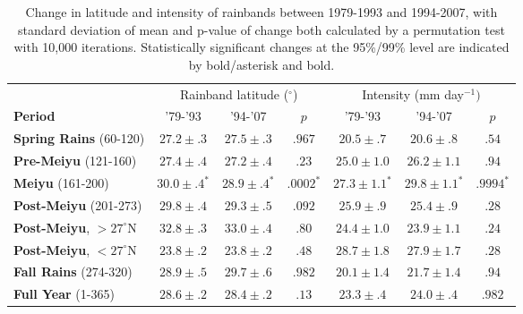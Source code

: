 \documentclass[draft,grl]{agutexSI}
\begin{document}
\begin{table}

\centering

\caption{Change in latitude and intensity of rainbands between 1979-1993 and 1994-2007, with standard deviation of mean and p-value of change both calculated by a permutation test with 10,000 iterations. Statistically significant changes at the 95\%/99\% level are indicated by bold/asterisk and bold.}

\begin{tabular}{ l c c c c c c}
	& \multicolumn{3}{c}{Rainband latitude ($^\circ$)} & \multicolumn{3}{c}{Intensity (mm day$^{-1})$} \\
	\textbf{Period} & '79-'93 & '94-'07 & $p$ & '79-'93 & '94-'07 & $p$ \\
	\hline	
	\textbf{Spring Rains} (60-120)		& $27.2 \pm .3 $ & $27.5 \pm .3 $ & $ .967 $ 	& $20.5 \pm .7$ 	& $20.6 \pm .8 	$ & $.54$ \\
	\textbf{Pre-Meiyu} (121-160) 		& $27.4 \pm .4 $ & $27.2 \pm .4$ & $ .23 $ 	& $25.0 \pm 1.0$ 	& $26.2 \pm 1.1	$ & $.94$ \\
	\textbf{Meiyu} (161-200)			& $\boldsymbol{30.0 \pm .4^*}$ & $\boldsymbol{28.9 \pm .4^*}$ & $\boldsymbol{.0002^*}$ & $\boldsymbol{27.3 \pm 1.1^*}$ 	& $\boldsymbol{29.8 \pm 1.1^*}$  & $\boldsymbol{.9994 ^*}$ \\
	\textbf{Post-Meiyu} (201-273)		& $29.8 \pm .4 $ & $29.3 \pm .5 $ & $ .092 $	& $25.9 \pm .9$ 	& $25.4 \pm .9	$ & $.28$ \\
	\textbf{Post-Meiyu}, $>27^\circ$N 	& $32.8 \pm .3 $ & $33.0 \pm .4 $ & $ .80 $ 	& $24.4 \pm 1.0$ 	& $23.9 \pm 1.1	$ & $.24$ \\
	\textbf{Post-Meiyu}, $<27^\circ$N 	& $23.8 \pm .2 $ & $23.8 \pm .2 $ & $ .48 $ 	& $28.7 \pm 1.8$ 	& $27.9 \pm 1.7	$ & $.28$  \\
	\textbf{Fall Rains} (274-320)			& $\boldsymbol{28.9 \pm .5} $ & $\boldsymbol{29.7 \pm .6} $ & $ \boldsymbol{.982} $ 	& $20.1 \pm 1.4$ 	& $21.7 \pm 1.4	$ & $.94$ \\
	\textbf{Full Year} (1-365)			& $28.6 \pm .2 $ & $28.4 \pm .2 $ & $ .13 $ 	& $\boldsymbol{23.3 \pm .4}$ 	& $\boldsymbol{24.0 \pm .4}	$ & $\boldsymbol{.982}$ \\

\end{tabular}
\label{ts8}
\end{table}
\end{document}
